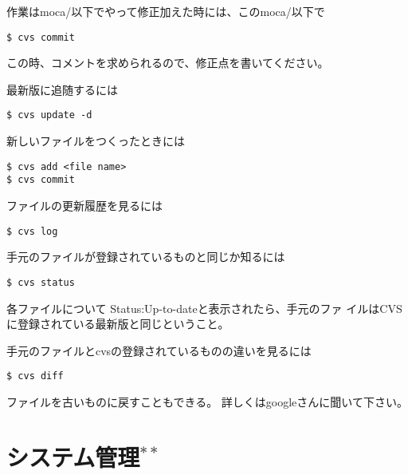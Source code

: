 \documentclass{jreport}
\begin{document}
作業はmoca/以下でやって修正加えた時には、このmoca/以下で
\begin{screen}
\begin{verbatim}
$ cvs commit
\end{verbatim}
\end{screen}
この時、コメントを求められるので、修正点を書いてください。

最新版に追随するには
\begin{screen}
\begin{verbatim}
$ cvs update -d
\end{verbatim}
\end{screen}

新しいファイルをつくったときには
\begin{screen}
\begin{verbatim}
$ cvs add <file name>
$ cvs commit
\end{verbatim}
\end{screen}

ファイルの更新履歴を見るには
\begin{screen}
\begin{verbatim}
$ cvs log
\end{verbatim}
\end{screen}

手元のファイルが登録されているものと同じか知るには
\begin{screen}
\begin{verbatim}
$ cvs status
\end{verbatim}
\end{screen}
各ファイルについて {\ttfamily Status:Up-to-date}と表示されたら、手元のファ
イルはCVSに登録されている最新版と同じということ。

手元のファイルとcvsの登録されているものの違いを見るには
\begin{screen}
\begin{verbatim}
$ cvs diff
\end{verbatim}
\end{screen}

ファイルを古いものに戻すこともできる。
詳しくはgoogleさんに聞いて下さい。



\chapter{システム管理$^{**}$}
\end{document}
